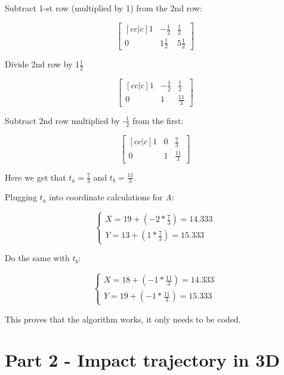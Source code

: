 \documentclass{article}
\begin{document}
Subtract 1-st row (multiplied by 1) from the 2nd row:


\begin{displaymath}
    \begin{bmatrix}[cc|c]
         1 & -\frac{1}{2} & \frac{1}{2} \\
         0 & 1\frac{1}{2} &  5\frac{1}{2}
    \end{bmatrix}
\end{displaymath}


Divide 2nd row by 1$\frac{1}{2}$

\begin{displaymath}
    \begin{bmatrix}[cc|c]
         1 & -\frac{1}{2} & \frac{1}{2} \\
         0 & 1 &  \frac{11}{3}
    \end{bmatrix}
\end{displaymath}


Subtract 2nd row multiplied by -$\frac{1}{2}$ from the first:

\begin{displaymath}
    \begin{bmatrix}[cc|c]
         1 & 0 & \frac{7}{3} \\
         0 & 1 &  \frac{11}{3}
    \end{bmatrix}
\end{displaymath}

Here we get that $t_a = \frac{7}{3}$ and $t_b = \frac{11}{3}$.

Plugging $t_a$ into coordinate calculations for \emph{A}:

\begin{displaymath}
    \begin{cases}
    X = 19 + (-2 * \frac{7}{3}) = 14.333 \\
    Y = 13 + (1 * \frac{7}{3}) = 15.333
    \end{cases}
\end{displaymath}


Do the same with $t_b$:

\begin{displaymath}
    \begin{cases}
    X = 18 + (-1 * \frac{11}{3}) = 14.333 \\
    Y = 19 + (-1 * \frac{11}{3}) = 15.333
    \end{cases}
\end{displaymath}

This proves that the algorithm works, it only needs to be coded.



\section{Part 2 - Impact trajectory in 3D} \label{part-2}
\end{document}
